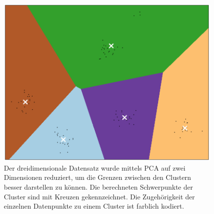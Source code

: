 \documentclass[11pt,a4paper]{article}
\begin{document}
\begin{figure}[h!]
	\centering
	\includegraphics[width=1\linewidth]{Figure_4}
	\caption{Der dreidimensionale Datensatz wurde mittels PCA auf zwei Dimensionen reduziert, um die Grenzen zwischen den Clustern besser darstellen zu können. Die berechneten Schwerpunkte der Cluster sind mit Kreuzen gekennzeichnet. Die Zugehörigkeit der einzelnen Datenpunkte zu einem Cluster ist farblich kodiert.}
	\label{fig:scatterplot2d}
\end{figure}
\end{document}
